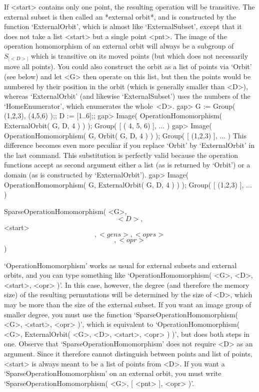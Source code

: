 If <start> contains  only one  point,   the resulting operation  will  be
transitive. The external  subset is then  called an *external orbit*, and
is  constructed by the  function  `ExternalOrbit',  which is almost  like
`ExternalSubset', except  that it  does not  take a   list <start> but  a
single point  <pnt>.  The  image of  the   operation homomorphism  of  an
external orbit   will  always be   a  subgroup of~$S_{|<D>|}$   which  is
transitive on  its moved points (but  which does not necessarily move all
points).  You could  also  construct the orbit   as a list of points  via
`Orbit' (see below) and  let <G> then operate on  this list, but then the
points  would be  numbered   by their  position in   the orbit (which  is
generally   smaller than  <D>),   whereas  `ExternalOrbit'  (and likewise
`ExternalSubset')   uses the  numbers   of  the  `HomeEnumerator',  which
enumerates the whole~<D>.
\begintt
    gap> G := Group( (1,2,3), (4,5,6) );;  D := [1..6];;
    gap> Image( OperationHomomorphism( ExternalOrbit( G, D, 4 ) ) );
    Group( [ ( 4, 5, 6) ], ... )
    gap> Image( OperationHomomorphism( G, Orbit( G, D, 4 ) ) );
    Group( [ (1,2,3) ], ... )
\endtt
This difference becomes   even more peculiar   if you replace  `Orbit' by
`ExternalOrbit' in the last command. This substitution is perfectly valid
because the  operation functions accept  as second argument either a list
(as is   returned  by  `Orbit') or   a   domain (as   is constructed   by
`ExternalOrbit').
\begintt
    gap> Image( OperationHomomorphism( G, ExternalOrbit( G, D, 4 ) ) );
    Group( [ (1,2,3) ], ... )
\endtt

\>SparseOperationHomomorphism( <G>, \[ <D>, \] <start> \[, <gens>, %
                               <oprs> \] \[, <opr> \] )

`OperationHomomorphism' works as usual  for external subsets and external
orbits, and you can type something like `OperationHomomorphism( <G>, <D>,
<start>, <opr> )'.  In this case, however,  the degree (and therefore the
memory size) of the resulting permutations will be determined by the size
of <D>, which  may be more  than the size  of the external subset. If you
want an  image   group of smaller  degree, you    must use  the  function
`SparseOperationHomomorphism( <G>, <start>, <opr> )', which is equivalent
to `OperationHomomorphism( <G>, ExternalOrbit( <G>, <D>, <start>, <opr> )
)',     but   does     both      steps    in     one.     Observe    that
`SparseOperationHomomorphism' does not require <D>  as an argument. Since
it therefore cannot  distinguish  between  points  and list of    points,
<start> is always  meant to be a  list of points  from <D>. If you want a
`SparseOperationHomomorphism' on  an  external   orbit, you   must  write
`SparseOperationHomomorphism( <G>, [ <pnt> ], <opr> )'.

